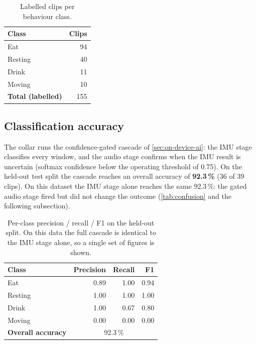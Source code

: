 \begin{table}[ht]
  \centering
  \caption{Labelled clips per behaviour class.}
  \label{tab:dataset-classes}
  \begin{tabularx}{\textwidth}{@{}Xr@{}}
    \toprule
    \textbf{Class} & \textbf{Clips} \\
    \midrule
    Eat      & 94 \\
    Resting  & 40 \\
    Drink    & 11 \\
    Moving   & 10 \\
    \midrule
    \textbf{Total (labelled)} & 155 \\
    \bottomrule
  \end{tabularx}
\end{table}

\subsection{Classification accuracy}

The collar runs the confidence-gated cascade of \cref{sec:on-device-ai}: the IMU stage classifies every
window, and the audio stage confirms when the IMU result is uncertain (softmax confidence below the
operating threshold of 0.75). On the held-out test split the cascade reaches an overall accuracy of
\textbf{92.3\,\%} (36 of 39 clips). On this dataset the IMU stage alone reaches the same 92.3\,\%: the
gated audio stage fired but did not change the outcome (\cref{tab:confusion} and the following
subsection).

\begin{table}[ht]
  \centering
  \caption{Per-class precision / recall / F1 on the held-out split. On this data the full cascade is
           identical to the IMU stage alone, so a single set of figures is shown.}
  \label{tab:accuracy}
  \begin{tabularx}{\textwidth}{@{}X rrr@{}}
    \toprule
    \textbf{Class} & \textbf{Precision} & \textbf{Recall} & \textbf{F1} \\
    \midrule
    Eat      & 0.89 & 1.00 & 0.94 \\
    Resting  & 1.00 & 1.00 & 1.00 \\
    Drink    & 1.00 & 0.67 & 0.80 \\
    Moving   & 0.00 & 0.00 & 0.00 \\
    \midrule
    \textbf{Overall accuracy} & \multicolumn{3}{c}{92.3\,\%} \\
    \bottomrule
  \end{tabularx}
\end{table}

